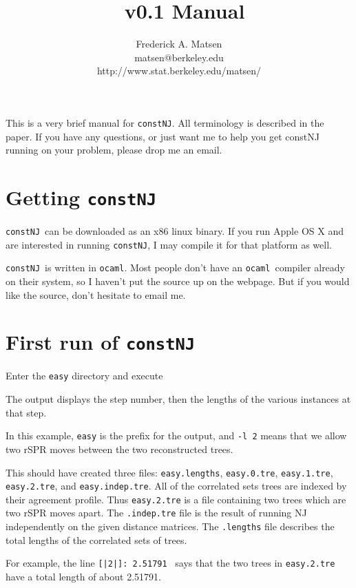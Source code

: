 \documentclass{article}
\title{\constNJ\ v0.1 Manual}
\author{Frederick A. Matsen\\
matsen@berkeley.edu\\
http://www.stat.berkeley.edu/\rqtilde matsen/
}
\newcommand{\constNJ}{\texttt{constNJ}}
\newcommand{\ocaml}{\texttt{ocaml}}
\newcommand{\noarxiv}[1]{}
\begin{document}
\maketitle

\noarxiv{\newpage}

This is a very brief manual for \constNJ. 
All terminology is described in the paper.
If you have any questions, or just want me to help you get constNJ running on your problem, please drop me an email.

\section{Getting \constNJ}

\constNJ\ can be downloaded as an x86 linux binary. If you run Apple OS X and are interested in running \constNJ, I may compile it for that platform as well. 

\constNJ\ is written in \ocaml. Most people don't have an \ocaml\ compiler already on their system, so I haven't put the source up on the webpage. But if you would like the source, don't hesitate to email me.

\section{First run of \constNJ}

Enter the \texttt{easy} directory and execute



The output displays the step number, then the lengths of the various instances at that step.

In this example, \texttt{easy} is the prefix for the output, and \texttt{-l 2} means that we allow two rSPR moves between the two reconstructed trees.

This should have created three files: \texttt{easy.lengths}, \texttt{easy.0.tre}, \texttt{easy.1.tre}, \texttt{easy.2.tre}, and \texttt{easy.indep.tre}.
All of the correlated sets trees are indexed by their agreement profile.
Thus \texttt{easy.2.tre} is a file containing two trees which are two rSPR moves apart.
The \texttt{.indep.tre} file is the result of running NJ independently on the given distance matrices.
The \texttt{.lengths} file describes the total lengths of the correlated sets of trees.



For example, the line \texttt{[|2|]: 2.51791} \ says that the two trees in \texttt{easy.2.tre} have a total length of about 2.51791. 
\end{document}

